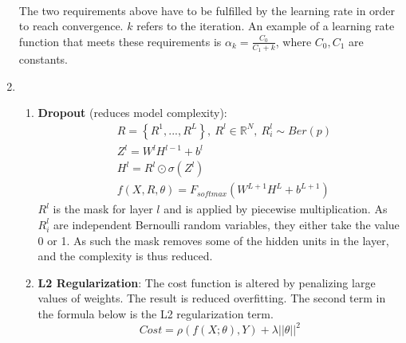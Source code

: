 \documentclass{article}
\begin{document}
\begin{enumerate}[label=(\alph*)]
\begin{align*}
	\end{align*}
	The two requirements above have to be fulfilled by the learning rate in order to reach convergence. $k$ refers to the iteration. An example of a learning rate function that meets these requirements is $\alpha_k = \frac{C_0}{C_1 + k}$, where $C_0, C_1$ are constants.
	\item \begin{enumerate}[label=(\roman*)]
		\item \textbf{Dropout} (reduces model complexity):
		\begin{align*}
			&R = \left\{R^1, ..., R^L\right\}, \ R^l \in \mathbb{R}^N, \ R^l_i \sim Ber(p) \\
			&Z^l = W^lH^{l-1} + b^l \\
			&H^l = R^l \odot \sigma(Z^l)\\
			&f(X, R, \theta) = F_{softmax}\left(W^{L+1}H^L + b^{L+1}\right)
		\end{align*}
		$R^l$ is the mask for layer $l$ and is applied by piecewise multiplication. As $R^l_i$ are independent Bernoulli random variables, they either take the value 0 or 1. As such the mask removes some of the hidden units in the layer, and the complexity is thus reduced.
		\item \textbf{L2 Regularization}:
	The cost function is altered by penalizing large values of weights. The result is reduced overfitting. The second term in the formula below is the L2 regularization term.
	$$Cost = \rho(f(X; \theta), Y) + \lambda ||\theta||^2$$ 
	\end{enumerate}
\end{enumerate}
\end{document}

